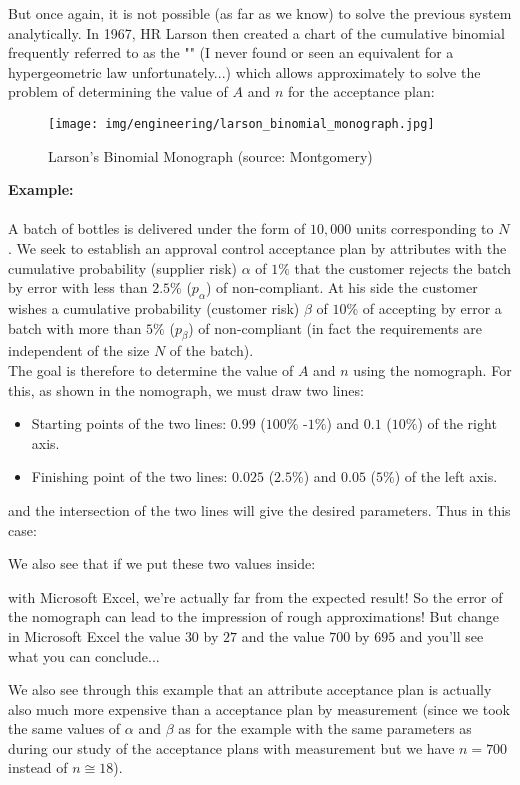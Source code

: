 	But once again, it is not possible (as far as we know) to solve the previous system analytically. In 1967, HR Larson then created a chart of the cumulative binomial frequently referred to as the "" (I never found or seen an equivalent for a hypergeometric law unfortunately...) which allows approximately to solve the problem of determining the value of $A$ and $n$ for the acceptance plan:
	\begin{figure}[H]
		\centering
		\texttt{[image: img/engineering/larson\_binomial\_monograph.jpg]}
		\caption[Larson's Binomial Monograph]{Larson's Binomial Monograph (source: Montgomery)}	
	\end{figure}
	\begin{tcolorbox}[colframe=black,colback=white,sharp corners]
	\textbf{{\Large {}}Example:}\\\\
	A batch of bottles is delivered under the form of $10,000$ units corresponding to $N$. We seek to establish an approval control acceptance plan by attributes with the cumulative probability (supplier risk) $\alpha$ of $1\%$ that the customer rejects the batch by error with less than $2.5\%$ ($p_\alpha$) of non-compliant. At his side the customer wishes a cumulative probability (customer risk) $\beta$ of $10\%$ of accepting by error a batch with more than $5\%$ ($p_\beta$) of non-compliant (in fact the requirements are independent of the size $N$ of the batch).\\

	The goal is therefore to determine the value of $A$ and $n$ using the nomograph. For this, as shown in the nomograph, we must draw two lines:

	\begin{itemize}
		\item Starting points of the two lines: $0.99$ ($100\%$ -$1\%$) and $0.1$ ($10\%$) of the right axis.

		\item Finishing point of the two lines: $0.025$ ($2.5\%$) and $0.05$ ($5\%$) of the left axis.
	\end{itemize}
	\end{tcolorbox}

	\begin{tcolorbox}[colframe=black,colback=white,sharp corners]
	and the intersection of the two lines will give the desired parameters. Thus in this case:
	
	We also see that if we put these two values inside:
	
	with Microsoft Excel, we're actually far from the expected result! So the error of the nomograph can lead to the impression of rough approximations! But change in Microsoft Excel  the value $30$ by $27$ and the value $700$ by $695$ and you'll see what you can conclude...
	\end{tcolorbox}
	We also see through this example that an attribute acceptance plan is actually also much more expensive than a acceptance plan by measurement (since we took the same values of $\alpha$ and $\beta$ as for the example with the same parameters as during our study of the acceptance plans with measurement but we have $n=700$ instead of $n\cong 18$).
	
